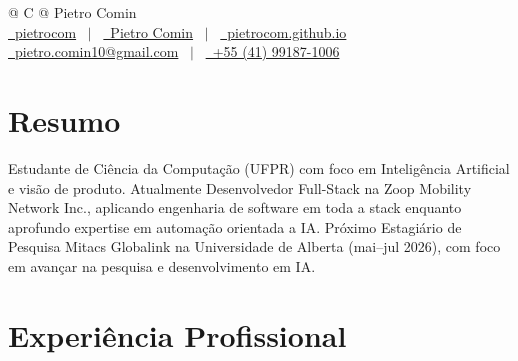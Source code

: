 \documentclass[a4paper,12pt]{article}
\begin{document}
\pagestyle{empty} 


\begin{tabularx}{\linewidth}{@{} C @{}}
\Huge{Pietro Comin} \\[7.5pt]
\href{https://github.com/pietrocom}{\raisebox{-0.05\height}\faGithub\ pietrocom} \ $|$ \ 
\href{https://linkedin.com/in/pietro-comin}{\raisebox{-0.05\height}\faLinkedin\ Pietro Comin} \ $|$ \ 
\href{https://pietrocom.github.io/}{\raisebox{-0.05\height}\faGlobe \ pietrocom.github.io} \\
\href{mailto:pietro.comin10@gmail.com}{\raisebox{-0.05\height}\faEnvelope \ pietro.comin10@gmail.com} \ $|$ \ 
\href{tel:+55(41)991871006}{\raisebox{-0.05\height}\faMobile \ +55 (41) 99187-1006} \\
\end{tabularx}

\section{Resumo}
Estudante de Ciência da Computação (UFPR) com foco em Inteligência Artificial e visão de produto. Atualmente Desenvolvedor Full-Stack na Zoop Mobility Network Inc., aplicando engenharia de software em toda a stack enquanto aprofundo expertise em automação orientada a IA. Próximo Estagiário de Pesquisa Mitacs Globalink na Universidade de Alberta (mai--jul 2026), com foco em avançar na pesquisa e desenvolvimento em IA.


\section{Experiência Profissional}
\end{document}
